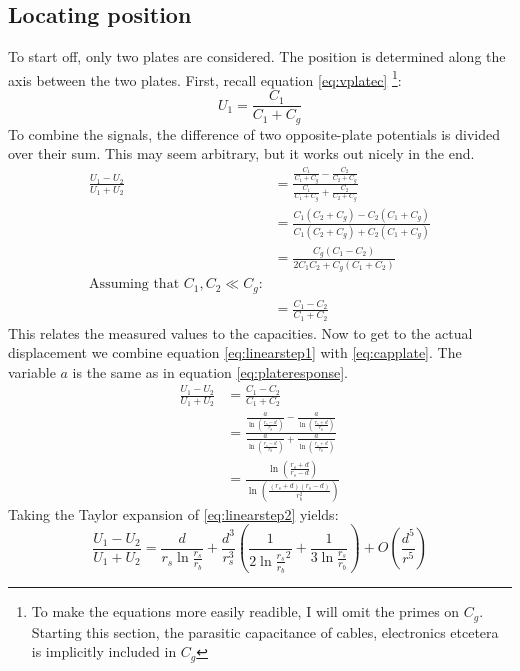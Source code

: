 \subsection{Locating position}
To start off, only two plates are considered. The position is determined along the axis between the two plates. First, recall equation \ref{eq:vplatec} \footnote{To make the equations more easily readible, I will omit the primes on $C_g$. Starting this section, the parasitic capacitance of cables, electronics etcetera is implicitly included in $C_g$}:
\begin{equation*}
U_1=\frac{C_1}{C_1+C_g}
\end{equation*}
To combine the signals, the difference of two opposite-plate potentials is divided over their sum. This may seem arbitrary, but it works out nicely in the end.
\begin{align}
\frac{U_1-U_2}{U_1+U_2} &= \frac{\frac{C_1}{C_1+C_g}-\frac{C_2}{C_2+C_g}}{\frac{C_1}{C_1+C_g}+\frac{C_2}{C_2+C_g}} \nonumber \\
&= \frac{C_1(C_2+C_g)-C_2(C_1+C_g)}{C_1(C_2+C_g)+C_2(C_1+C_g)} \nonumber \\
&= \frac{C_g(C_1-C_2)}{2C_1C_2+C_g(C_1+C_2)} \nonumber  \\
\text{Assuming that $C_1,C_2 \ll C_g$:} \nonumber \\
&= \frac{C_1-C_2}{C_1+C_2} \label{eq:linearstep1}
\end{align}
This relates the measured values to the capacities. Now to get to the actual displacement we combine equation \ref{eq:linearstep1} with \ref{eq:capplate}. The variable $a$ is the same as in equation \ref{eq:plateresponse}.
\begin{align}
\frac{U_1-U_2}{U_1+U_2} &= \frac{C_1-C_2}{C_1+C_2} \nonumber \\
&= \frac{\frac{a}{\ln\left(\frac{r_s-d}{r_b}\right)}-\frac{a}{\ln\left(\frac{r_s+d}{r_b}\right)}}{\frac{a}{\ln\left(\frac{r_s-d}{r_b}\right)}+\frac{a}{\ln\left(\frac{r_s+d}{r_b}\right)}} \nonumber \\
&= \frac{\ln\left(\frac{r_s+d}{r_s-d}\right)}{\ln\left(\frac{(r_s+d)(r_s-d)}{r_b^2}\right)}\label{eq:linearstep2}
\end{align}
Taking the Taylor expansion of \ref{eq:linearstep2} yields:
\begin{equation}
\frac{U_1-U_2}{U_1+U_2}=\frac{d}{r_s\ln\frac{r_s}{r_b}} + \frac{d^3}{r_s^3}\left(\frac{1}{2\ln\frac{r_s}{r_b}^2}+\frac{1}{3\ln\frac{r_s}{r_b}}\right)+O(\frac{d^5}{r^5}) \label{eq:linearstep3}
\end{equation}

